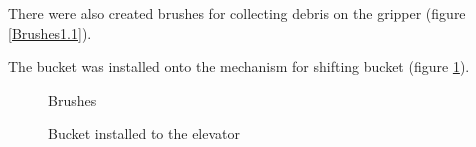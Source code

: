 There were also created brushes for collecting debris on the gripper (figure \ref{Brushes1.1}).

The bucket was installed onto the mechanism for shifting bucket (figure \ref{Bucket1.3}).

\begin{figure}[H]
	\begin{minipage}[h]{0.47\linewidth}
		\caption{Brushes}
		\label{Brushes1.1}
	\end{minipage}
	\hfill
	\begin{minipage}[h]{0.47\linewidth}
		\caption{Bucket installed to the elevator}
		\label{Bucket1.3}
	\end{minipage}
\end{figure}

